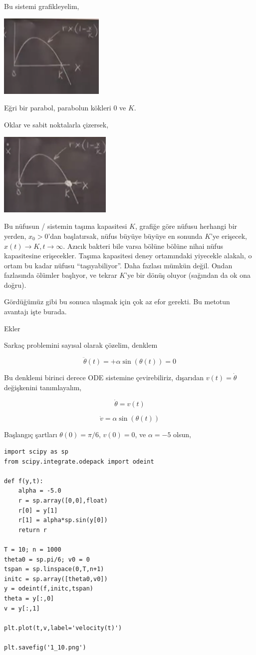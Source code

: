 \documentclass[12pt,fleqn]{article}\usepackage{../../common}
\begin{document}
Bu sistemi grafikleyelim, 

\includegraphics[height=4cm]{1_08.png}

Eğri bir parabol, parabolun kökleri 0 ve $K$. 

Oklar ve sabit noktalarla çizersek, 

\includegraphics[height=4cm]{1_09.png}

Bu nüfusun / sistemin taşıma kapasitesi $K$, grafiğe göre nüfusu herhangi
bir yerden, $x_0 > 0$'dan başlatırsak, nüfus büyüye büyüye en sonunda
$K$'ye erişecek, $x(t) \to K, t \to \infty$. Azıcık bakteri bile varsa
bölüne bölüne nihai nüfus kapasitesine erişecekler. Taşıma kapasitesi
deney ortamındaki yiyecekle alakalı, o ortam bu kadar nüfusu
``taşıyabiliyor''. Daha fazlası mümkün değil. Ondan fazlasında ölümler
başlıyor, ve tekrar $K$'ye bir dönüş oluyor (sağından da ok ona doğru). 

Gördüğümüz gibi bu sonuca ulaşmak için çok az efor gerekti. Bu metotun
avantajı işte burada. 

Ekler

Sarkaç problemini sayısal olarak çözelim, denklem

$$ \ddot{\theta}(t) = + \alpha \sin(\theta(t)) = 0  $$

Bu denklemi birinci derece ODE sistemine çevirebiliriz, dışarıdan
$v(t) = \dot{\theta}$ değişkenini tanımlayalım, 

$$ \dot{\theta} = v(t)$$

$$ \dot{v} = \alpha \sin (\theta(t))$$

Başlangıç şartları $\theta(0) = \pi/6$, $v(0) = 0$, ve $\alpha = -5$ olsun,

\begin{verbatim}
import scipy as sp
from scipy.integrate.odepack import odeint

def f(y,t):
    alpha = -5.0
    r = sp.array([0,0],float)
    r[0] = y[1]
    r[1] = alpha*sp.sin(y[0])
    return r

T = 10; n = 1000
theta0 = sp.pi/6; v0 = 0
tspan = sp.linspace(0,T,n+1)
initc = sp.array([theta0,v0])
y = odeint(f,initc,tspan)
theta = y[:,0]
v = y[:,1]

plt.plot(t,v,label='velocity(t)')

plt.savefig('1_10.png')
\end{verbatim}
\end{document}
